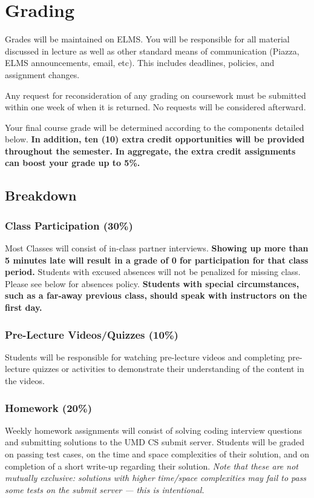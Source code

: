 \documentclass[12pt]{article}
\begin{document}
\section*{Grading}
\noindent Grades will be maintained on ELMS.
You will be responsible for all material discussed in lecture as well as other standard means of communication (Piazza, ELMS announcements, email, etc).
This includes deadlines, policies, and assignment changes.

Any request for reconsideration of any grading on coursework must be submitted within one week of when it is returned.
No requests will be considered afterward.

Your final course grade will be determined according to the components detailed below.
\textbf{In addition, ten (10) extra credit opportunities will be provided throughout the semester.}
\textbf{In aggregate, the extra credit assignments can boost your grade up to 5\%.} \medskip

\subsection*{Breakdown}
\subsubsection*{Class Participation (30\%)}

\noindent Most Classes will consist of in-class partner interviews.
\textbf{Showing up more than 5 minutes late will result in a grade of 0 for participation for that class period.}
Students with excused absences will not be penalized for missing class.
Please see below for absences policy.
\textbf{​Students with special circumstances, such as a far-away previous class, should speak with instructors on the first day.}

\subsubsection*{Pre-Lecture Videos/Quizzes (10\%)}
Students will be responsible for watching pre-lecture videos and
completing pre-lecture quizzes or activities to demonstrate their understanding of the content in the videos.

\subsubsection*{Homework (20\%)}
Weekly homework assignments will consist of solving coding interview questions and submitting solutions to the UMD CS submit server.
Students will be graded on passing test cases, on the time and space complexities of their solution, and on completion of a short write-up regarding their solution.
{\em Note that these are not mutually exclusive: solutions with higher time/space complexities may fail to pass some tests on the submit server --- this is intentional.}
\end{document}
